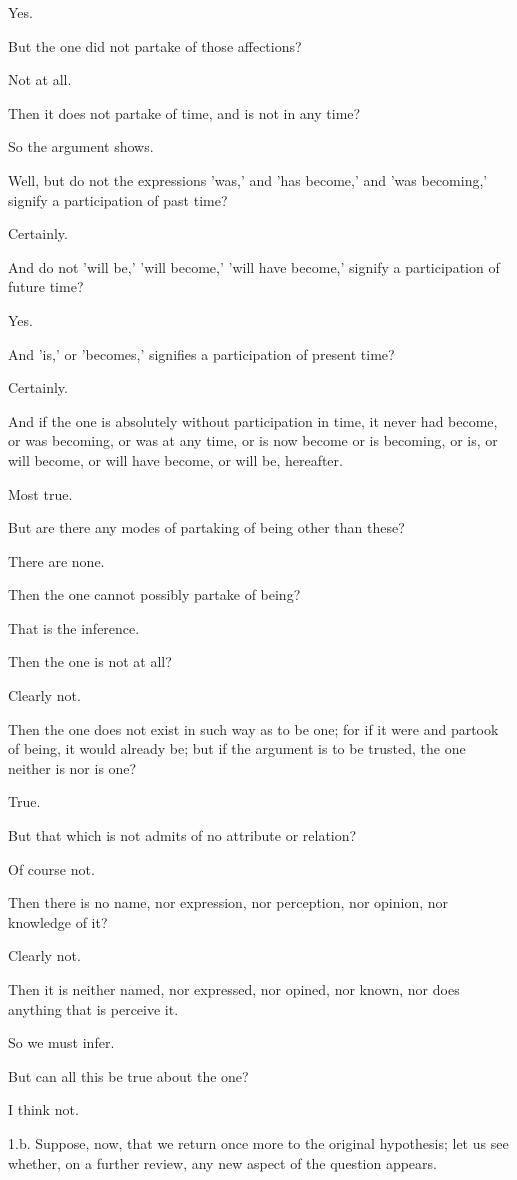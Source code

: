 Yes.

But the one did not partake of those affections?

Not at all.

Then it does not partake of time, and is not in any time?

So the argument shows.

Well, but do not the expressions 'was,' and 'has become,' and 'was
becoming,' signify a participation of past time?

Certainly.

And do not 'will be,' 'will become,' 'will have become,' signify a
participation of future time?

Yes.

And 'is,' or 'becomes,' signifies a participation of present time?

Certainly.

And if the one is absolutely without participation in time, it never
had become, or was becoming, or was at any time, or is now become or
is becoming, or is, or will become, or will have become, or will be,
hereafter.

Most true.

But are there any modes of partaking of being other than these?

There are none.

Then the one cannot possibly partake of being?

That is the inference.

Then the one is not at all?

Clearly not.

Then the one does not exist in such way as to be one; for if it were
and partook of being, it would already be; but if the argument is to be
trusted, the one neither is nor is one?

True.

But that which is not admits of no attribute or relation?

Of course not.

Then there is no name, nor expression, nor perception, nor opinion, nor
knowledge of it?

Clearly not.

Then it is neither named, nor expressed, nor opined, nor known, nor does
anything that is perceive it.

So we must infer.

But can all this be true about the one?

I think not.

1.b. Suppose, now, that we return once more to the original hypothesis;
let us see whether, on a further review, any new aspect of the question
appears.

